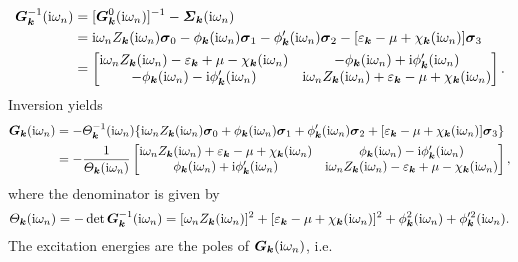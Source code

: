 \begin{align*}
    \boldsymbol G_{\boldsymbol k}^{-1}(\mathrm i \omega_n) &=
    [\boldsymbol G^0_{\boldsymbol k}(\mathrm i \omega_n)]^{-1} - \boldsymbol {\varSigma}_{\boldsymbol k}(\mathrm i \omega_n)
    \\
    &= \mathrm i \omega_n Z_{\boldsymbol k}(\mathrm i \omega_n) \boldsymbol \sigma_0
    - \phi _{\boldsymbol k}(\mathrm i \omega_n) \boldsymbol \sigma_1
    - \phi'_{\boldsymbol k}(\mathrm i \omega_n) \boldsymbol \sigma_2
    - [\varepsilon_{\boldsymbol k} - \mu + \chi_{\boldsymbol k}(\mathrm i \omega_n)] \boldsymbol \sigma_3 \\
    &= \begin{bmatrix}
        \mathrm i \omega_n Z_{\boldsymbol k}(\mathrm i \omega_n)
        - \varepsilon_{\boldsymbol k} + \mu - \chi_{\boldsymbol k}(\mathrm i \omega_n) &
        -\phi_{\boldsymbol k}(\mathrm i \omega_n) + \mathrm i \phi'_{\boldsymbol k}(\mathrm i \omega_n) \\
        -\phi_{\boldsymbol k}(\mathrm i \omega_n) - \mathrm i \phi'_{\boldsymbol k}(\mathrm i \omega_n) &
        \mathrm i \omega_n Z_{\boldsymbol k}(\mathrm i \omega_n)
        + \varepsilon_{\boldsymbol k} - \mu + \chi_{\boldsymbol k}(\mathrm i \omega_n)
    \end{bmatrix}.
\end{align*}
%
Inversion yields
%
\begin{align*}
    \boldsymbol G_{\boldsymbol k}(\mathrm i \omega_n) &= -\varTheta_{\boldsymbol k}^{-1}(\mathrm i \omega_n) \{
        \mathrm i \omega_n Z_{\boldsymbol k}(\mathrm i \omega_n) \boldsymbol \sigma_0
        + \phi _{\boldsymbol k}(\mathrm i \omega_n) \boldsymbol \sigma_1
        + \phi'_{\boldsymbol k}(\mathrm i \omega_n) \boldsymbol \sigma_2
        + [\varepsilon_{\boldsymbol k} - \mu + \chi_{\boldsymbol k}(\mathrm i \omega_n)] \boldsymbol \sigma_3
        \}
    \\
    &= -\frac 1 {\varTheta_{\boldsymbol k}(\mathrm i \omega_n)}
    \begin{bmatrix}
        \mathrm i \omega_n Z_{\boldsymbol k}(\mathrm i \omega_n)
        + \varepsilon_{\boldsymbol k} - \mu + \chi_{\boldsymbol k}(\mathrm i \omega_n) &
        \phi_{\boldsymbol k}(\mathrm i \omega_n) - \mathrm i \phi'_{\boldsymbol k}(\mathrm i \omega_n) \\
        \phi_{\boldsymbol k}(\mathrm i \omega_n) + \mathrm i \phi'_{\boldsymbol k}(\mathrm i \omega_n) &
        \mathrm i \omega_n Z_{\boldsymbol k}(\mathrm i \omega_n)
        - \varepsilon_{\boldsymbol k} + \mu - \chi_{\boldsymbol k}(\mathrm i \omega_n)
    \end{bmatrix},
\end{align*}
%
where the denominator is given by
%
\begin{equation*}
    \varTheta_{\boldsymbol k}(\mathrm i \omega_n) = -\det \boldsymbol G_{\boldsymbol k}^{-1}(\mathrm i \omega_n)
    = [\omega_n Z_{\boldsymbol k}(\mathrm i \omega_n)]^2
    + [\varepsilon_{\boldsymbol k} - \mu + \chi_{\boldsymbol k}(\mathrm i \omega_n)]^2
    + \phi ^2_{\boldsymbol k}(\mathrm i \omega_n)
    + \phi'^2_{\boldsymbol k}(\mathrm i \omega_n).
\end{equation*}
%
The excitation energies are the poles of $\boldsymbol G_{\boldsymbol k}(\mathrm i \omega_n)$, i.e.
